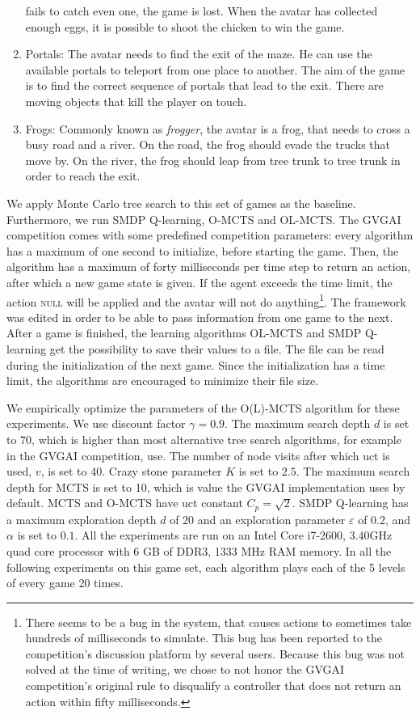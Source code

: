\begin{enumerate}
		fails to catch even one, the game is lost. When the avatar
		has collected enough eggs, it is possible to shoot the chicken to win
		the game.
	\item Portals:
		The avatar needs to find the exit of the maze. He can use the available
		portals to teleport from one place to another. The aim of the game is to
		find the correct sequence of portals that lead to the exit. There are
		moving objects that kill the player on touch.
	\item Frogs:
		Commonly known as \textit{frogger}, the avatar is a frog, that needs to
		cross a busy road and a river. On the road, the frog should evade the
		trucks that move by. On the river, the frog should leap from tree trunk
		to tree trunk in order to reach the exit.
\end{enumerate}

We apply Monte Carlo tree search to this set of games as the baseline.
Furthermore, we run SMDP Q-learning, O-MCTS and OL-MCTS.  The GVGAI competition
comes with some predefined competition parameters: every algorithm has a maximum
of one second to initialize, before starting the game. Then, the algorithm has a
maximum of forty milliseconds per time step to return an action, after which a
new game state is given. If the agent exceeds the time limit, the action
\textsc{null} will be applied and the avatar will not do anything\footnote{There
	seems to be a bug in the system, that causes actions to sometimes take
	hundreds of milliseconds to simulate. This bug has been reported to the
	competition's discussion platform by several users. Because this bug was not
	solved at the time of writing, we chose to not honor the GVGAI competition's
	original rule to disqualify a controller that does not return an action
within fifty milliseconds.}. The framework was edited in order to be able to
pass information from one game to the next. After a game is finished, the
learning algorithms OL-MCTS and SMDP Q-learning get the possibility to save their
values to a file. The file can be read during the initialization of the next
game. Since the initialization has a time limit, the algorithms are encouraged
to minimize their file size.

We empirically optimize the parameters of the O(L)-MCTS algorithm for these
experiments. We use discount factor $\gamma = 0.9$. The maximum search depth $d$
is set to 70, which is higher than most alternative tree search algorithms, for
example in the GVGAI competition, use. The number of node visits after which
\textsf{uct} is used, $v$, is set to 40. Crazy stone parameter $K$ is set to
$2.5$. The maximum search depth for MCTS is set to 10, which is value the GVGAI
implementation uses by default.  MCTS and O-MCTS have \textsf{uct} constant $C_p
= \sqrt{2}$. SMDP Q-learning has a maximum exploration depth $d$ of 20 and an
exploration parameter $\varepsilon$ of 0.2, and $\alpha$ is set to $0.1$.  All the
experiments are run on an Intel %
Core %
i7-2600, 3.40GHz quad core processor with 6 GB of DDR3, 1333 MHz RAM memory. In
all the following experiments on this game set, each algorithm plays each of the
5 levels of every game 20 times. 

